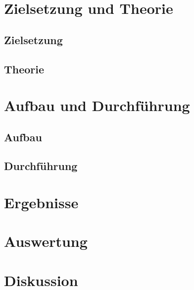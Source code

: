 





\maketitle
\tableofcontents
\newpage

\section{Zielsetzung und Theorie}

\subsection{Zielsetzung}


\subsection{Theorie}


\section{Aufbau und Durchführung}

\subsection{Aufbau}


\subsection{Durchführung}


\section{Ergebnisse}


\section{Auswertung}


\section{Diskussion}


\newpage
\nocite{*}
\printbibliography


